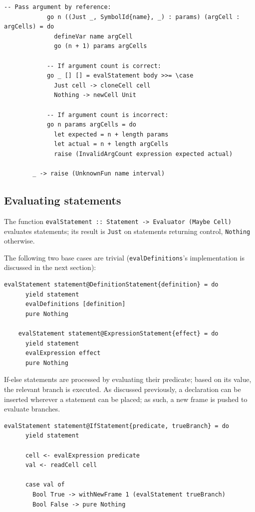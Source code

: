 \documentclass[UdineBachThesis,american,11pt]{PhdThesis}
\begin{document}
  \pagebreak

  \begin{Verbatim}[gobble=4,fontsize=\small]
            -- Pass argument by reference:
            go n ((Just _, SymbolId{name}, _) : params) (argCell : argCells) = do
              defineVar name argCell
              go (n + 1) params argCells

            -- If argument count is correct:
            go _ [] [] = evalStatement body >>= \case
              Just cell -> cloneCell cell
              Nothing -> newCell Unit

            -- If argument count is incorrect:
            go n params argCells = do
              let expected = n + length params
              let actual = n + length argCells
              raise (InvalidArgCount expression expected actual)

        _ -> raise (UnknownFun name interval)
  \end{Verbatim}

  \subsection{Evaluating statements}

  The function
  \mbox{\texttt{evalStatement :: Statement -> Evaluator (Maybe Cell)}} evaluates
  statements; its result is \mbox{\texttt{Just}} on statements returning
  control, \mbox{\texttt{Nothing}} otherwise.

  The following two base cases are trivial (\mbox{\texttt{evalDefinitions}}'s
  implementation is discussed in the next section):

  \begin{Verbatim}[gobble=4,fontsize=\small]
    evalStatement statement@DefinitionStatement{definition} = do
      yield statement
      evalDefinitions [definition]
      pure Nothing

    evalStatement statement@ExpressionStatement{effect} = do
      yield statement
      evalExpression effect
      pure Nothing
  \end{Verbatim}

  If-else statements are processed by evaluating their predicate; based on its
  value, the relevant branch is executed. As discussed previously, a declaration
  can be inserted wherever a statement can be placed; as such, a new frame is
  pushed to evaluate branches.

  \begin{Verbatim}[gobble=4,fontsize=\small]
    evalStatement statement@IfStatement{predicate, trueBranch} = do
      yield statement

      cell <- evalExpression predicate
      val <- readCell cell

      case val of
        Bool True -> withNewFrame 1 (evalStatement trueBranch)
        Bool False -> pure Nothing
  \end{Verbatim}
\end{document}

